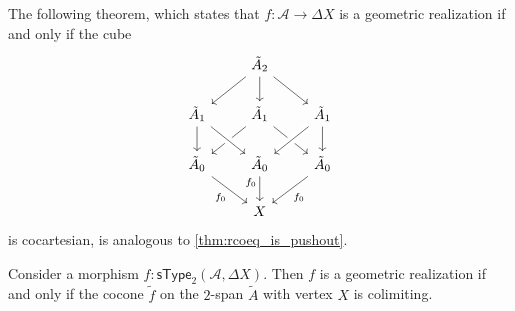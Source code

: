 \begin{comment}
\begin{lem}
Consider a $2$-semi-simplicial type $\mathcal{A}$
\begin{align*}
A_0 & : \UU \\
A_1 & : A_0\to A_0\to \UU \\
A_2 & : \prd{x,y,z:A_0} A_1(x,y)\to A_1(x,z)\to A_1(y,z)\to \UU,
\end{align*}
and consider
\begin{align*}
\alpha & : \prd{x,y:A_0} A_1(x,y)\to (x=y) \\
\beta & : \prd{x,y,z:A_0}{p:A_1(x,y)}{r:A_1(x,z)}{q:A_1(y,z)} A_2(p,r,q)\to (\ct{\alpha(p)}{\alpha(q)}=\alpha(r)). 
\end{align*}
Then the function $(x,y,z,p,q,r,s)\mapsto(x,x,x,y,y,y,z)$ of type
\begin{align*}
\cdots \to \tilde{A}_2
\end{align*}
is an equivalence. 
\end{lem}
\end{comment}

The following theorem, which states that $f:\mathcal{A}\to \Delta X$ is a geometric realization if and only if the cube
\begin{equation*}
\begin{tikzcd}
& \tilde A_2 \arrow[dl] \arrow[d] \arrow[dr] \\
\tilde A_1 \arrow[d] & \tilde A_1 \arrow[dl] \arrow[dr] & \tilde A_1 \arrow[dl,crossing over] \arrow[d] \\
\tilde A_0 \arrow[dr,swap,"f_0"] & \tilde A_0 \arrow[from=ul,crossing over] \arrow[d,swap,"f_0" near start] & \tilde A_0  \arrow[dl,"f_0"] \\
& X
\end{tikzcd}
\end{equation*}
is cocartesian, is analogous to \cref{thm:rcoeq_is_pushout}.

\begin{thm}
Consider a morphism $f:\mathsf{sType}_2(\mathcal{A},\Delta X)$. Then $f$ is a geometric realization if and only if the cocone $\tilde{f}$ on the $2$-span $\tilde{A}$ with vertex $X$ is colimiting.
\end{thm}

